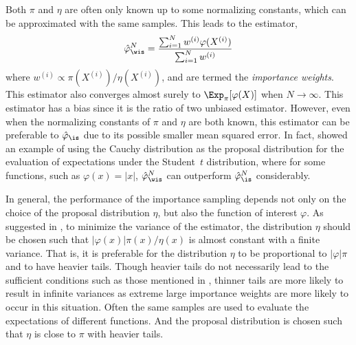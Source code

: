 Both $\pi$ and $\eta$ are often only known up to some normalizing constants, which can be approximated with the same samples. This leads to the estimator,
\begin{equation}
  \hat\varphi_{\wis}^N
  = \frac{\sum_{i=1}^Nw^{(i)}\varphi(X^{(i)})}{\sum_{i=1}^Nw^{(i)}}
  \label{eq:is unnormalized}
\end{equation}
where $w^{(i)} \propto \pi(X^{(i)})/\eta(X^{(i)})$, and are termed the \emph{importance weights}. This estimator also converges almost surely to $\Exp_{\pi}[\varphi(X)]$ when $N\to\infty$. This estimator has a bias since it is the ratio of two unbiased estimator. However, even when the normalizing constants of $\pi$ and $\eta$ are both known, this estimator can be preferable to $\hat\varphi_{\is}$ due to its possible smaller mean squared error. In fact, \cite{Casella:1998tj} showed an example of using the Cauchy distribution as the proposal distribution for the evaluation of expectations under the Student~$t$ distribution, where for some functions, such as $\varphi(x) = |x|$, $\hat\varphi_{\wis}^N$ can outperform $\hat\varphi_{\is}^N$ considerably.

In general, the performance of the importance sampling depends not only on the choice of the proposal distribution $\eta$, but also the function of interest $\varphi$. As suggested in \cite[][sec.~3.3.2]{Robert:2004tn}, to minimize the variance of the estimator, the distribution $\eta$ should be chosen such that $|\varphi(x)|\pi(x)/\eta(x)$ is almost constant with a finite variance. That is, it is preferable for the distribution $\eta$ to be proportional to $|\varphi|\pi$ and to have heavier tails. Though heavier tails do not necessarily lead to the sufficient conditions such as those mentioned in \cite{Geweke:1989tm}, thinner tails are more likely to result in infinite variances as extreme large importance weights are more likely to occur in this situation. Often the same samples are used to evaluate the expectations of different functions. And the proposal distribution is chosen such that $\eta$ is close to $\pi$ with heavier tails.

